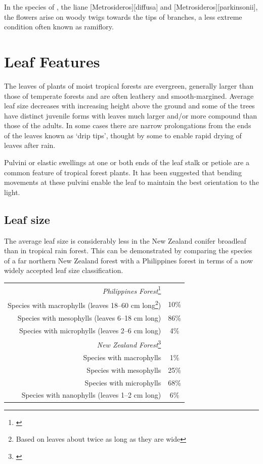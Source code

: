 In the species of ,  the liane [Metrosideros][diffusa] and [Metrosideros][parkinsonii], the flowers arise on woody twigs towards the tips of branches, a less extreme condition often known as ramiflory.

\section{Leaf Features}

The leaves of plants of moist tropical forests are evergreen, generally larger than those of temperate forests and are often leathery and smooth-margined.
Average leaf size decreases with increasing height above the ground and some of the trees have distinct juvenile forms with leaves much larger and/or more compound than those of the adults.
In some cases there are narrow prolongations from the ends of the leaves known as `drip tips', thought by some to enable rapid drying of leaves after rain.

Pulvini or elastic swellings at one or both ends of the leaf stalk or petiole are a common feature of tropical forest plants.
It has been suggested that bending movements at these pulvini enable the leaf to maintain the best orientation to the light.

\subsection{Leaf size}

The average leaf size is considerably less in the New Zealand conifer broadleaf than in tropical rain forest.
This can be demonstrated by comparing the species of a far northern New Zealand forest with a Philippines forest in terms of a now widely accepted leaf size classification.

\begin{xltabular}{0.8\textwidth}{ R c }
	\toprule
	\emph{Philippines Forest}\footnote{\cite{richards1952tropical}}\\
	Species with macrophylls (leaves 18--60 cm long\footnote{Based on leaves about twice as long as they are wide}) & 10\%\\
	Species with mesophylls (leaves 6--18 cm long) & 86\%\\
	Species with microphylls (leaves 2--6 cm long) & 4\%\\
	\emph{New Zealand Forest}\footnote{\cite{dawson1969lowland}}\\
	Species with macrophylls & 1\%\\
	Species with mesophylls & 25\%\\
	Species with microphylls & 68\%\\
	Species with nanophylls (leaves 1--2 cm long) & 6\%\\
	\bottomrule
\end{xltabular}

